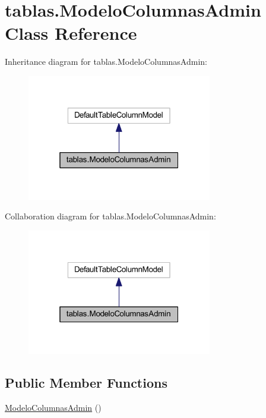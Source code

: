 \hypertarget{classtablas_1_1_modelo_columnas_admin}{}\section{tablas.\+Modelo\+Columnas\+Admin Class Reference}
\label{classtablas_1_1_modelo_columnas_admin}


Inheritance diagram for tablas.\+Modelo\+Columnas\+Admin\+:
\nopagebreak
\begin{figure}[H]
\begin{center}
\leavevmode
\includegraphics[width=229pt]{classtablas_1_1_modelo_columnas_admin__inherit__graph}
\end{center}
\end{figure}


Collaboration diagram for tablas.\+Modelo\+Columnas\+Admin\+:
\nopagebreak
\begin{figure}[H]
\begin{center}
\leavevmode
\includegraphics[width=229pt]{classtablas_1_1_modelo_columnas_admin__coll__graph}
\end{center}
\end{figure}
\subsection*{Public Member Functions}
\begin{DoxyCompactItemize}
\item 
\mbox{\hyperlink{classtablas_1_1_modelo_columnas_admin_a3eb7695156d3ba6516381929e474ec82}{Modelo\+Columnas\+Admin}} ()
\end{DoxyCompactItemize}


